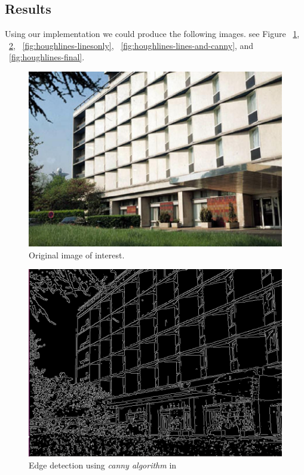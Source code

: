 \documentclass[letterpaper, 12 pt, conference ,onecolumn]{ieeeconf}  %
\begin{document}
\subsection*{Results}
Using our implementation we could produce the following images. see Figure ~\ref{fig:houghlines-origianl}, ~\ref{fig:houghlines-canny}, ~\ref{fig:houghlines-linesonly}, ~\ref{fig:houghlines-lines-and-canny}, and ~\ref{fig:houghlines-final}.
\begin{figure}[h!]
\includegraphics[width=0.4\paperwidth]{hough-lines/lines.jpg}
\caption{Original image of interest.}
\label{fig:houghlines-origianl}
\end{figure}

\begin{figure}[h!]
\includegraphics[width=0.4\paperwidth]{hough-lines/canny-image.jpg}
\caption{Edge detection using \textit{canny algorithm} in ~}
\label{fig:houghlines-canny}
\end{figure}
\end{document}
